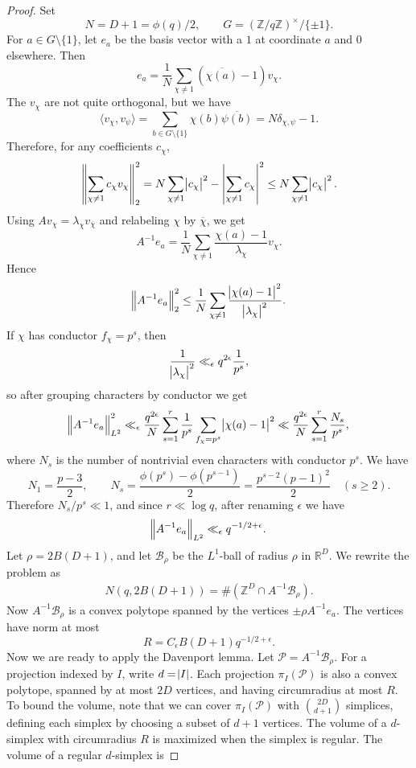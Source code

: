 \documentclass[10pt,a4paper]{amsart}
\newcommand{\bR}{\mathbb{R}}
\newcommand{\bZ}{\mathbb{Z}}
\def\cB{ {\mathcal B} }
\def\cP{{\mathcal P}}
\begin{document}
\begin{proof}
Set
\[
N = D+1 = \phi(q)/2,
\qquad
G = (\bZ/q\bZ)^\times/\{\pm 1\}.
\]
For $a \in G \setminus \{1\}$, let $e_a$ be the basis vector with a $1$ at coordinate $a$ and $0$ elsewhere. Then
\[
e_a
=
\frac{1}{N}
\sum_{\chi \neq 1}
\left(\overline{\chi(a)}-1\right)v_\chi.
\]
The $v_\chi$ are not quite orthogonal, but we have
\[
\langle v_\chi,v_\psi\rangle
=
\sum_{b \in G \setminus \{1\}}\chi(b)\overline{\psi(b)}
=
N\delta_{\chi,\psi}-1.
\]
Therefore, for any coefficients $c_\chi$,
\[
\left\|\sum_{\chi \neq 1} c_\chi v_\chi\right\|_{2}^2
=
N\sum_{\chi \neq 1}\abs{c_\chi}^2
-
\left|\sum_{\chi \neq 1}c_\chi\right|^2
\leq
N\sum_{\chi \neq 1}\abs{c_\chi}^2.
\]
Using $A v_\chi=\lambda_\chi v_{\overline{\chi}}$ and relabeling $\chi$ by $\overline{\chi}$, we get
\[
A^{-1}e_a
=
\frac{1}{N}
\sum_{\chi \neq 1}
\frac{\chi(a)-1}{\lambda_\chi}v_\chi.
\]
Hence
\[
\norm{A^{-1} e_a}_{2}^2
\leq
\frac{1}{N}
\sum_{\chi \neq 1}
\frac{\abs{\chi(a)-1}^2}{\abs{\lambda_\chi}^2}.
\]
If $\chi$ has conductor $f_\chi = p^s$, then
\[
\frac{1}{\abs{\lambda_\chi}^2}
\ll_\epsilon
q^{2\epsilon}\frac{1}{p^s},
\]
so after grouping characters by conductor we get
\[
\norm{A^{-1} e_a}_{L^2}^2
\ll_\epsilon
\frac{q^{2\epsilon}}{N}
\sum_{s=1}^r
\frac{1}{p^s}
\sum_{f_\chi = p^s}
\abs{\chi(a)-1}^2
\ll
\frac{q^{2\epsilon}}{N}
\sum_{s=1}^r \frac{N_s}{p^s},
\]
where $N_s$ is the number of nontrivial even characters with conductor $p^s$. We have
\[
N_1 = \frac{p-3}{2},
\qquad
N_s = \frac{\phi(p^s)-\phi(p^{s-1})}{2}
=
\frac{p^{s-2}(p-1)^2}{2}
\quad (s \geq 2).
\]
Therefore $N_s/p^s \ll 1$, and since $r \ll \log q$, after renaming $\epsilon$ we have
\[
\norm{A^{-1} e_a}_{L^2} \ll_\epsilon q^{-1/2+\epsilon}.
\]
Let $\rho = 2B(D+1)$, and let $\cB_\rho$ be the $L^1$-ball of radius $\rho$ in $\bR^D$. We rewrite the problem as
\begin{align*}
N(q,2B(D+1)) = \#(\bZ^D \cap A^{-1} \cB_\rho).
\end{align*}
Now $A^{-1} \cB_\rho$ is a convex polytope spanned by the vertices $\pm \rho A^{-1} e_a$. The vertices have norm at most
\[
R = C_\epsilon B (D+1) q^{-1/2+\epsilon}.
\]
Now we are ready to apply the Davenport lemma. Let $\cP=A^{-1}\cB_\rho$. For a projection indexed by $I$, write $d = \abs{I}$. Each projection $\pi_I(\cP)$ is also a convex polytope, spanned by at most $2D$ vertices, and having circumradius at most $R$. To bound the volume, note that we can cover $\pi_I(\cP)$ with $\binom{2D}{d+1}$ simplices, defining each simplex by choosing a subset of $d+1$ vertices. The volume of a $d$-simplex with circumradius $R$ is maximized when the simplex is regular. The volume of a regular $d$-simplex is

\end{proof}
\end{document}
